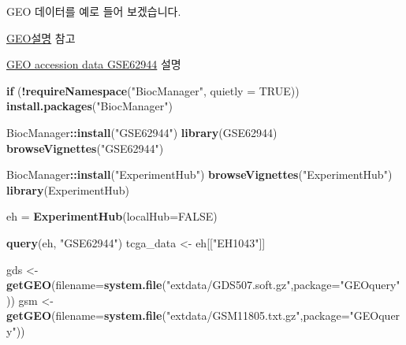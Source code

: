 \documentclass[
]{book}
\newenvironment{Shaded}{\begin{snugshade}}{\end{snugshade}}
\newcommand{\ControlFlowTok}[1]{\textcolor[rgb]{0.13,0.29,0.53}{\textbf{#1}}}
\newcommand{\DataTypeTok}[1]{\textcolor[rgb]{0.13,0.29,0.53}{#1}}
\newcommand{\KeywordTok}[1]{\textcolor[rgb]{0.13,0.29,0.53}{\textbf{#1}}}
\newcommand{\NormalTok}[1]{#1}
\newcommand{\OperatorTok}[1]{\textcolor[rgb]{0.81,0.36,0.00}{\textbf{#1}}}
\newcommand{\OtherTok}[1]{\textcolor[rgb]{0.56,0.35,0.01}{#1}}
\newcommand{\StringTok}[1]{\textcolor[rgb]{0.31,0.60,0.02}{#1}}
\begin{document}
GEO 데이터를 예로 들어 보겠습니다.

\href{https://www.ncbi.nlm.nih.gov/geo/info/overview.html}{GEO설명} 참고

\href{https://www.bioconductor.org/packages/release/data/experiment/html/GSE62944.html}{GEO accession data GSE62944} 설명

\begin{Shaded}
\begin{Highlighting}[]
\ControlFlowTok{if}\NormalTok{ (}\OperatorTok{!}\KeywordTok{requireNamespace}\NormalTok{(}\StringTok{"BiocManager"}\NormalTok{, }\DataTypeTok{quietly =} \OtherTok{TRUE}\NormalTok{))}
    \KeywordTok{install.packages}\NormalTok{(}\StringTok{"BiocManager"}\NormalTok{)}

\NormalTok{BiocManager}\OperatorTok{::}\KeywordTok{install}\NormalTok{(}\StringTok{"GSE62944"}\NormalTok{)}
\KeywordTok{library}\NormalTok{(GSE62944)}
\KeywordTok{browseVignettes}\NormalTok{(}\StringTok{"GSE62944"}\NormalTok{)}

\NormalTok{BiocManager}\OperatorTok{::}\KeywordTok{install}\NormalTok{(}\StringTok{"ExperimentHub"}\NormalTok{)}
\KeywordTok{browseVignettes}\NormalTok{(}\StringTok{"ExperimentHub"}\NormalTok{)}
\KeywordTok{library}\NormalTok{(ExperimentHub)}

\NormalTok{eh =}\StringTok{ }\KeywordTok{ExperimentHub}\NormalTok{(}\DataTypeTok{localHub=}\OtherTok{FALSE}\NormalTok{)}

\KeywordTok{query}\NormalTok{(eh, }\StringTok{"GSE62944"}\NormalTok{)}
\NormalTok{tcga\_data <{-}}\StringTok{ }\NormalTok{eh[[}\StringTok{"EH1043"}\NormalTok{]]}
\end{Highlighting}
\end{Shaded}

\begin{Shaded}
\begin{Highlighting}[]
\NormalTok{gds <{-}}\StringTok{ }\KeywordTok{getGEO}\NormalTok{(}\DataTypeTok{filename=}\KeywordTok{system.file}\NormalTok{(}\StringTok{"extdata/GDS507.soft.gz"}\NormalTok{,}\DataTypeTok{package=}\StringTok{"GEOquery"}\NormalTok{))}
\NormalTok{gsm <{-}}\StringTok{ }\KeywordTok{getGEO}\NormalTok{(}\DataTypeTok{filename=}\KeywordTok{system.file}\NormalTok{(}\StringTok{"extdata/GSM11805.txt.gz"}\NormalTok{,}\DataTypeTok{package=}\StringTok{"GEOquery"}\NormalTok{))}
\end{Highlighting}
\end{Shaded}
\end{document}
